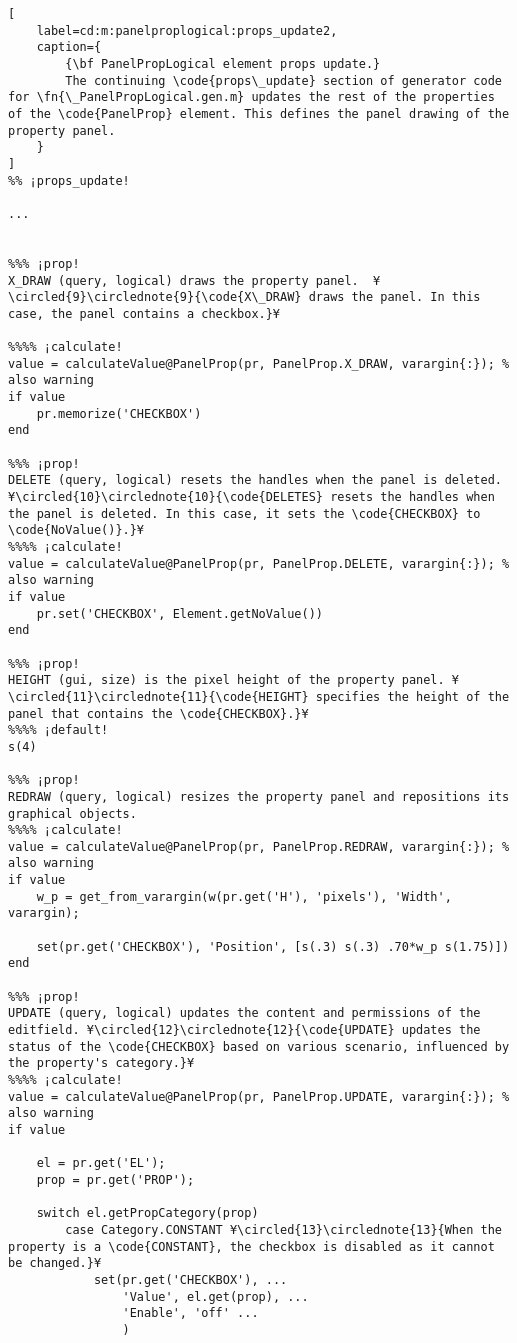 \documentclass{tufte-handout}
\begin{document}
\begin{lstlisting}[
	label=cd:m:panelproplogical:props_update2,
	caption={
		{\bf PanelPropLogical element props update.}
		The continuing \code{props\_update} section of generator code for \fn{\_PanelPropLogical.gen.m} updates the rest of the properties of the \code{PanelProp} element. This defines the panel drawing of the property panel.
	}
]
%% ¡props_update!

...


%%% ¡prop!
X_DRAW (query, logical) draws the property panel.  ¥\circled{9}\circlednote{9}{\code{X\_DRAW} draws the panel. In this case, the panel contains a checkbox.}¥

%%%% ¡calculate!
value = calculateValue@PanelProp(pr, PanelProp.X_DRAW, varargin{:}); % also warning
if value
    pr.memorize('CHECKBOX')
end

%%% ¡prop!
DELETE (query, logical) resets the handles when the panel is deleted. ¥\circled{10}\circlednote{10}{\code{DELETES} resets the handles when the panel is deleted. In this case, it sets the \code{CHECKBOX} to \code{NoValue()}.}¥
%%%% ¡calculate!
value = calculateValue@PanelProp(pr, PanelProp.DELETE, varargin{:}); % also warning
if value
    pr.set('CHECKBOX', Element.getNoValue())
end

%%% ¡prop!
HEIGHT (gui, size) is the pixel height of the property panel. ¥\circled{11}\circlednote{11}{\code{HEIGHT} specifies the height of the panel that contains the \code{CHECKBOX}.}¥
%%%% ¡default!
s(4)

%%% ¡prop!
REDRAW (query, logical) resizes the property panel and repositions its graphical objects.
%%%% ¡calculate!
value = calculateValue@PanelProp(pr, PanelProp.REDRAW, varargin{:}); % also warning
if value
    w_p = get_from_varargin(w(pr.get('H'), 'pixels'), 'Width', varargin);
    
    set(pr.get('CHECKBOX'), 'Position', [s(.3) s(.3) .70*w_p s(1.75)])
end    

%%% ¡prop!
UPDATE (query, logical) updates the content and permissions of the editfield. ¥\circled{12}\circlednote{12}{\code{UPDATE} updates the status of the \code{CHECKBOX} based on various scenario, influenced by the property's category.}¥
%%%% ¡calculate!
value = calculateValue@PanelProp(pr, PanelProp.UPDATE, varargin{:}); % also warning
if value

    el = pr.get('EL');
    prop = pr.get('PROP');
    
    switch el.getPropCategory(prop)
        case Category.CONSTANT ¥\circled{13}\circlednote{13}{When the property is a \code{CONSTANT}, the checkbox is disabled as it cannot be changed.}¥
            set(pr.get('CHECKBOX'), ...
                'Value', el.get(prop), ...
                'Enable', 'off' ...
                )


\end{lstlisting}
\end{document}
